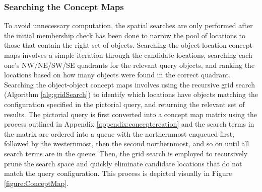 \subsubsection{Searching the Concept Maps}
To avoid unnecessary computation, the spatial searches are only performed after the initial membership check has been done to narrow the pool of locations to those that contain the right set of objects.
Searching the object-location concept maps involves a simple iteration through the candidate locations, searching each one's NW/NE/SW/SE quadrants for the relevant query objects, and ranking the locations based on how many objects were found in the correct quadrant. 
Searching the object-object concept maps involves using the recursive grid search (Algorithm \ref{alg:gridSearch}) to identify which locations have objects matching the configuration specified in the pictorial query, and returning the relevant set of results. 
The pictorial query is first converted into a concept map matrix using the process outlined in Appendix \ref{appendix:conceptcreation} and the search terms in the matrix are ordered into a queue with the northernmost enqueued first, followed by the westernmost, then the second northernmost, and so on until all search terms are in the queue.
Then, the grid search is employed to recursively prune the search space and quickly eliminate candidate locations that do not match the query configuration.
This process is depicted visually in Figure \ref{figure:ConceptMap}.

